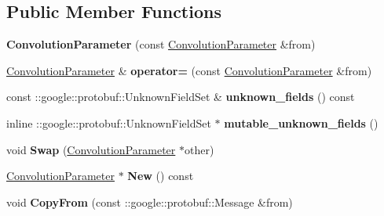 \subsection*{Public Member Functions}
\begin{DoxyCompactItemize}
\item 
\mbox{\label{classcaffe_1_1_convolution_parameter_a412fb8d8524721901c37e8bbb0eeb3d8}} 
{\bfseries Convolution\+Parameter} (const \mbox{\hyperlink{classcaffe_1_1_convolution_parameter}{Convolution\+Parameter}} \&from)
\item 
\mbox{\label{classcaffe_1_1_convolution_parameter_a156d4a159e231e24cd20216f23bbed76}} 
\mbox{\hyperlink{classcaffe_1_1_convolution_parameter}{Convolution\+Parameter}} \& {\bfseries operator=} (const \mbox{\hyperlink{classcaffe_1_1_convolution_parameter}{Convolution\+Parameter}} \&from)
\item 
\mbox{\label{classcaffe_1_1_convolution_parameter_a99400e24fd00be6433df17f781eee7cf}} 
const \+::google\+::protobuf\+::\+Unknown\+Field\+Set \& {\bfseries unknown\+\_\+fields} () const
\item 
\mbox{\label{classcaffe_1_1_convolution_parameter_abbbeb669dd5866a2cabd8dfc6b374bf4}} 
inline \+::google\+::protobuf\+::\+Unknown\+Field\+Set $\ast$ {\bfseries mutable\+\_\+unknown\+\_\+fields} ()
\item 
\mbox{\label{classcaffe_1_1_convolution_parameter_aaa0bcc3b8e62858f40ca9a7a2d71c08f}} 
void {\bfseries Swap} (\mbox{\hyperlink{classcaffe_1_1_convolution_parameter}{Convolution\+Parameter}} $\ast$other)
\item 
\mbox{\label{classcaffe_1_1_convolution_parameter_aa17d90f0faf990091e1f57fa50e51c1f}} 
\mbox{\hyperlink{classcaffe_1_1_convolution_parameter}{Convolution\+Parameter}} $\ast$ {\bfseries New} () const
\item 
\mbox{\label{classcaffe_1_1_convolution_parameter_ae26987c4374bf82b636510a815a7e014}} 
void {\bfseries Copy\+From} (const \+::google\+::protobuf\+::\+Message \&from)

\end{DoxyCompactItemize}
